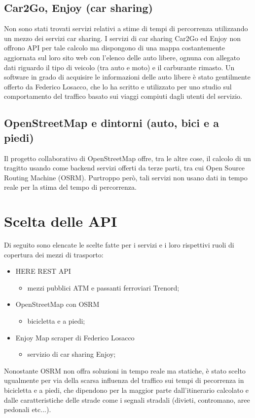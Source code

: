 \subsection{Car2Go, Enjoy (car sharing)}

Non sono stati trovati servizi relativi a stime di tempi di percorrenza utilizzando un mezzo dei servizi car sharing. I servizi di car sharing Car2Go ed Enjoy non offrono API per tale calcolo ma dispongono di una mappa costantemente aggiornata sul loro sito web con l'elenco delle auto libere, ognuna con allegato dati riguardo il tipo di veicolo (tra auto e moto) e il carburante rimasto. Un software in grado di acquisire le informazioni delle auto libere è stato gentilmente offerto da Federico Losacco, che lo ha scritto e utilizzato per uno studio sul comportamento del traffico basato sui viaggi compiuti dagli utenti del servizio\cite{losaccofederico}.

\subsection{OpenStreetMap e dintorni (auto, bici e a piedi)}

Il progetto collaborativo di OpenStreetMap offre, tra le altre cose, il calcolo di un tragitto usando come backend servizi offerti da terze parti, tra cui Open Source Routing Machine (OSRM). Purtroppo però, tali servizi non usano dati in tempo reale per la stima del tempo di percorrenza\cite{osm}.

\section{Scelta delle API}

Di seguito sono elencate le scelte fatte per i servizi e i loro rispettivi ruoli di copertura dei mezzi di trasporto:

\begin{itemize}
	\item HERE REST API\cite{herewegoapi}
	\begin{itemize}
		\item mezzi pubblici ATM e passanti ferroviari Trenord;
	\end{itemize}

	\item OpenStreetMap con OSRM\cite{openstreetmap}
	\begin{itemize}
		\item bicicletta e a piedi;
	\end{itemize}

	\item Enjoy Map scraper di Federico Losacco\cite{enjoycarsharing}\cite{losaccofederico}
	\begin{itemize}
		\item servizio di car sharing Enjoy;
	\end{itemize}
\end{itemize}
Nonostante OSRM non offra soluzioni in tempo reale ma statiche, è stato scelto ugualmente per via della scarsa influenza del traffico sui tempi di pecorrenza in bicicletta e a piedi, che dipendono per la maggior parte dall'itinerario calcolato e dalle caratteristiche delle strade come i segnali stradali (divieti, contromano, aree pedonali etc...).

